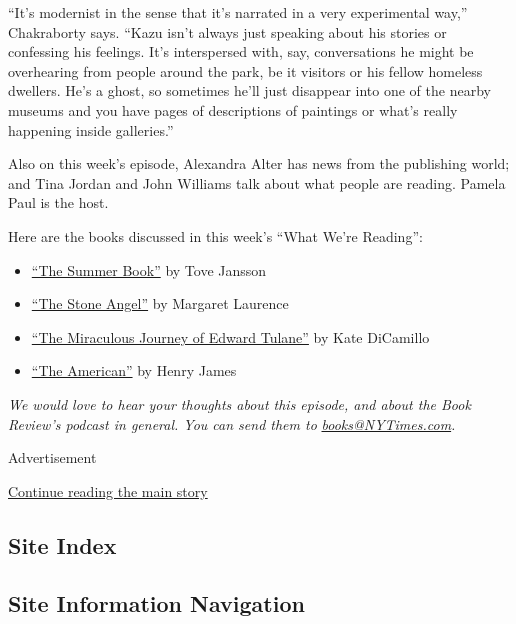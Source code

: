 ``It's modernist in the sense that it's narrated in a very experimental
way,'' Chakraborty says. ``Kazu isn't always just speaking about his
stories or confessing his feelings. It's interspersed with, say,
conversations he might be overhearing from people around the park, be it
visitors or his fellow homeless dwellers. He's a ghost, so sometimes
he'll just disappear into one of the nearby museums and you have pages
of descriptions of paintings or what's really happening inside
galleries.''

Also on this week's episode, Alexandra Alter has news from the
publishing world; and Tina Jordan and John Williams talk about what
people are reading. Pamela Paul is the host.

Here are the books discussed in this week's ``What We're Reading'':

\begin{itemize}
\item
  \href{https://www.nyrb.com/products/the-summer-book?variant=1094932625}{``The
  Summer Book''} by Tove Jansson
\item
  \href{https://www.nytimes3xbfgragh.onion/1964/06/14/archives/selfimprisoned-to.html}{``The
  Stone Angel''} by Margaret Laurence
\item
  \href{https://www.nytimes3xbfgragh.onion/2006/05/14/books/review/14hearn.html}{``The
  Miraculous Journey of Edward Tulane''} by Kate DiCamillo
\item
  \href{https://www.penguinrandomhouse.com/books/326557/the-american-by-henry-james/}{``The
  American''} by Henry James
\end{itemize}

\emph{We would love to hear your thoughts about this episode, and about
the Book Review's podcast in general. You can send them to}
\href{mailto:books@NYTimes.com}{\emph{books@NYTimes.com}}\emph{.}

Advertisement

\protect\hyperlink{after-bottom}{Continue reading the main story}

\hypertarget{site-index}{%
\subsection{Site Index}\label{site-index}}

\hypertarget{site-information-navigation}{%
\subsection{Site Information
Navigation}\label{site-information-navigation}}

